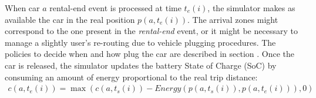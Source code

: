 When car $a$ rental-end event is processed at time $t_{e}(i)$, the simulator makes as available the car in the real position $p(a,t_{e}(i))$. The arrival zones might correspond to the one present in the \emph{rental-end} event, or it might be necessary to manage a slightly user's re-routing due to vehicle plugging procedures. The policies to decide when and how plug the car are described in section . Once the car is released, the simulator updates the battery State of Charge (SoC) by consuming an amount of energy proportional to the real trip distance:
\begin{eqnarray*}
	c(a,t_{e}(i)) = \nonumber \hspace{0cm}   \max{(c(a,t_{s}(i)) - Energy(p(a,t_{s}(i)), p(a,t_{e}(i))), 0)} 
\end{eqnarray*}

